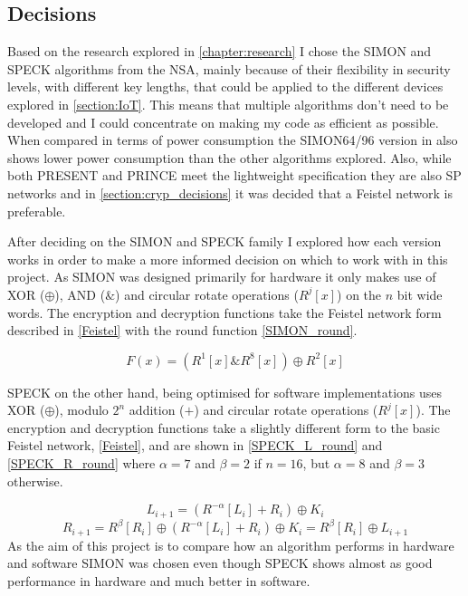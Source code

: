 \documentclass[12pt,twoside,a4paper]{report}
\begin{document}
    \subsection{Decisions}
    Based on the research explored in \autoref{chapter:research} I chose the SIMON and SPECK algorithms from the NSA, mainly because of their flexibility in security levels, with different key lengths, that could be applied to the different devices explored in \autoref{section:IoT}. This means that multiple algorithms don't need to be developed and I could concentrate on making my code as efficient as possible.
    When compared in terms of power consumption the SIMON64/96 version in \cite{Banik2015} also shows lower power consumption than the other algorithms explored.
    Also, while both PRESENT and PRINCE meet the lightweight specification they are also SP networks and in \autoref{section:cryp_decisions} it was decided that a Feistel network is preferable.
    
    After deciding on the SIMON and SPECK family I explored how each version works in order to make a more informed decision on which to work with in this project.
    As SIMON was designed primarily for hardware it only makes use of XOR ($\oplus$), AND ($\&$) and circular rotate operations ($R^j[x]$) on the $n$ bit wide words.
    The encryption and decryption functions take the Feistel network form described in \autoref{Feistel} with the round function \autoref{SIMON_round}.
    
    \begin{equation}
    \label{SIMON_round}
    F(x) = (R^1[x]\&R^8[x]) \oplus R^2[x]
    \end{equation}
    
    SPECK on the other hand, being optimised for software implementations uses XOR ($\oplus$), modulo $2^n$ addition ($+$) and circular rotate operations ($R^j[x]$).
    The encryption and decryption functions take a slightly different form to the basic Feistel network, \autoref{Feistel}, and are shown in \autoref{SPECK_L_round} and \ref{SPECK_R_round} where $\alpha = 7$ and $\beta = 2$ if $n = 16$, but $\alpha = 8$ and $\beta = 3$ otherwise.
    
    \begin{equation}
    \label{SPECK_L_round}
    L_{i+1} = (R^{-\alpha}[L_i] + R_i) \oplus K_i
    \end{equation}
    \begin{equation}
    \label{SPECK_R_round}
    R_{i+1} = R^{\beta}[R_i] \oplus (R^{-\alpha}[L_i] + R_i) \oplus K_i = R^{\beta}[R_i] \oplus L_{i+1}
    \end{equation}
    As the aim of this project is to compare how an algorithm performs in hardware and software SIMON was chosen even though SPECK shows almost as good performance in hardware and much better in software. 
    
\end{document}
